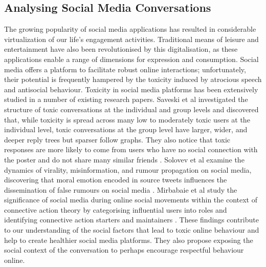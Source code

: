 \documentclass[acmtog]{acmart}
\begin{document}
\subsection{Analysing Social Media Conversations}
The growing popularity of social media applications has resulted in considerable virtualization of our life's engagement activities. Traditional means of leisure and entertainment have also been revolutionised by this digitalisation, as these applications enable a range of dimensions for expression and consumption. Social media offers a platform to facilitate robust online interactions; unfortunately, their potential is frequently hampered by the toxicity induced by atrocious speech and antisocial behaviour. Toxicity in social media platforms has been extensively studied in a number of existing research papers. Saveski et al investigated the structure of toxic conversations at the individual and group levels and discovered that, while toxicity is spread across many low to moderately toxic users at the individual level, toxic conversations at the group level have larger, wider, and deeper reply trees but sparser follow graphs. They also notice that toxic responses are more likely to come from users who have no social connection with the poster and do not share many similar friends \cite{saveski2021structure}. Solovev et al examine the dynamics of virality, misinformation, and rumour propagation on social media, discovering that moral emotion encoded in source tweets influences the dissemination of false rumours on social media \cite{solovev2022moral}. Mirbabaie et al study the significance of social media during online social movements within the context of connective action theory by categorising influential users into roles and identifying connective action starters and maintainers \cite{mirbabaie2021development}. These findings contribute to our understanding of the social factors that lead to toxic online behaviour and help to create healthier social media platforms. They also propose exposing the social context of the conversation to perhaps encourage respectful behaviour online.

\end{document}
